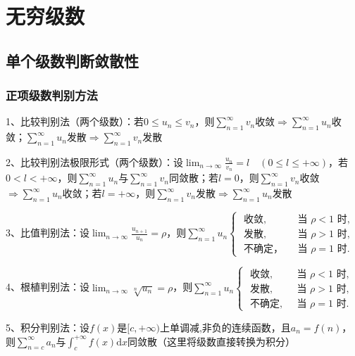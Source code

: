 \chapter{无穷级数}

\section{单个级数判断敛散性}



\subsection{正项级数判别方法}

1、比较判别法（两个级数）：若$0 \leqslant u_{n} \leqslant v_{n}$，则$\sum_{n=1}^{\infty} v_{n}$收敛$\Rightarrow \sum_{n=1}^{\infty} u_{n}$收敛；$\sum_{n=1}^{\infty} u_{n}$发散$\Rightarrow \sum_{n=1}^{\infty} v_{n}$发散

2、比较判别法极限形式（两个级数）：设$\lim_{n \rightarrow \infty} \frac{u_{n}}{v_{n}}=l \quad(0 \leqslant l \leqslant+\infty)$，若$0<l<+\infty$，则$\sum_{n=1}^{\infty} u_{n}$与$\sum_{n=1}^{\infty} v_{n}$同敛散；若$l=0$，则$\sum_{n=1}^{\infty} v_{n}$收敛$\Rightarrow \sum_{n=1}^{\infty} u_{n}$收敛；若$l=+\infty$，则$\sum_{n=1}^{\infty} v_{n}$发散$\Rightarrow \sum_{n=1}^{\infty} u_{n}$发散

3、比值判别法：设$\lim_{n \rightarrow \infty} \frac{u_{n+1}}{u_{n}}=\rho$，则$\sum_{n=1}^{\infty} u_{n} \begin{cases}\text { 收敛, } & \text { 当 } \rho<1 \text { 时, } \\ \text { 发散, } & \text { 当 } \rho>1 \text { 时, } \\ \text { 不确定， } & \text { 当 } \rho=1 \text { 时. }\end{cases}$

4、根植判别法：设$\lim_{n \rightarrow \infty} \sqrt[n]{u_{n}}=\rho$，则$\sum_{n=1}^{\infty} u_{n} \begin{cases}\text { 收敛, } & \text { 当 } \rho<1 \text { 时, } \\ \text { 发散, } & \text { 当 } \rho>1 \text { 时, } \\ \text { 不确定, } & \text { 当 } \rho=1 \text { 时. }\end{cases}$

5、积分判别法：设$f(x)$是$[c,+\infty)$上单调减,非负的连续函数，且$a_{n}=f(n)$，则$\sum_{n=c}^{\infty} a_{n}$与$\int_{c}^{+\infty} f(x) \mathrm{d} x$同敛散（这里将级数直接转换为积分）

